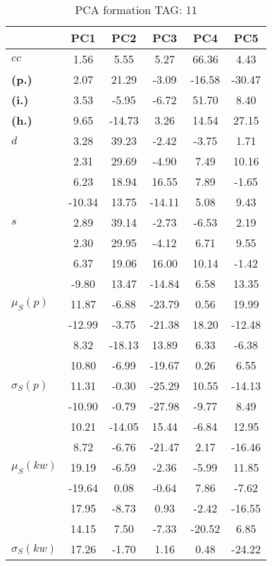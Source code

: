 \begin{table}[h!]
\begin{center}
\caption{PCA formation TAG: 11}
	\label{tab:tpca}
\begin{tabular}{l || c | c | c | c | c}\hline
 & {\bf PC1} & {\bf PC2} & {\bf PC3} & {\bf PC4} & {\bf PC5} \\\hline\hline
{\bf $cc$} & 1.56 & 5.55 & 5.27 & 66.36 & 4.43 \\
{\bf (p.)} & 2.07 & 21.29 & -3.09 & -16.58 & -30.47 \\
{\bf (i.)} & 3.53 & -5.95 & -6.72 & 51.70 & 8.40 \\
{\bf (h.)} & 9.65 & -14.73 & 3.26 & 14.54 & 27.15 \\\hline
{\bf $d$} & 3.28 & 39.23 & -2.42 & -3.75 & 1.71 \\
{\bf } & 2.31 & 29.69 & -4.90 & 7.49 & 10.16 \\
{\bf } & 6.23 & 18.94 & 16.55 & 7.89 & -1.65 \\
{\bf } & -10.34 & 13.75 & -14.11 & 5.08 & 9.43 \\\hline
{\bf $s$} & 2.89 & 39.14 & -2.73 & -6.53 & 2.19 \\
{\bf } & 2.30 & 29.95 & -4.12 & 6.71 & 9.55 \\
 & 6.37  & 19.06  & 16.00  & 10.14  & -1.42 \\
 & -9.80  & 13.47  & -14.84  & 6.58  & 13.35 \\\hline
$\mu_S(p)$ & 11.87  & -6.88  & -23.79  & 0.56  & 19.99 \\
 & -12.99  & -3.75  & -21.38  & 18.20  & -12.48 \\
 & 8.32  & -18.13  & 13.89  & 6.33  & -6.38 \\
 & 10.80  & -6.99  & -19.67  & 0.26  & 6.55 \\\hline
$\sigma_S(p)$ & 11.31  & -0.30  & -25.29  & 10.55  & -14.13 \\
 & -10.90  & -0.79  & -27.98  & -9.77  & 8.49 \\
 & 10.21  & -14.05  & 15.44  & -6.84  & 12.95 \\
 & 8.72  & -6.76  & -21.47  & 2.17  & -16.46 \\\hline
$\mu_S(kw)$ & 19.19  & -6.59  & -2.36  & -5.99  & 11.85 \\
 & -19.64  & 0.08  & -0.64  & 7.86  & -7.62 \\
 & 17.95  & -8.73  & 0.93  & -2.42  & -16.55 \\
 & 14.15  & 7.50  & -7.33  & -20.52  & 6.85 \\\hline
$\sigma_S(kw)$ & 17.26  & -1.70  & 1.16  & 0.48  & -24.22 \\

\end{tabular}
\end{center}
\end{table}
